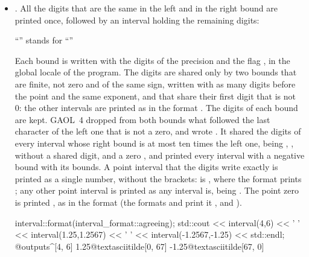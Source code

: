 \documentclass[12pt,a4paper,twoside,openright]{book}
\begin{document}
\begin{itemize}
\item[$\bullet$] . All the digits that are the same in
the left and in the right bound are printed once, followed by an interval
holding the remaining digits:
\begin{center}
``\element{3.141\textasciitilde[5926, 6001]}'' stands for
``''
\end{center}
Each bound is written with the digits of the precision and the flag
, in the global locale of the program. The digits are
shared only by two bounds that are finite, not zero and of the same sign,
written with as many digits before the point and the same exponent, and
that share their first digit that is not 0: the other intervals are printed
as in the format . The digits of each bound are
kept.\newinvfive{} GAOL~4 dropped from both bounds what followed the last
character of the left one that is not a zero, and wrote 
\code{1.25\textasciitilde[, ]}. It shared the digits of every interval
whose right bound is at most ten times the left one,  being
\code{1\textasciitilde[., 0.]},  \code{\textasciitilde[4., 6.]},
without a shared digit, and a zero \code{\textasciitilde[-0., 0.]}, and
printed every interval with a negative bound with its bounds. A point
interval that the digits write exactly is printed as a single number,
without the brackets:  is ,
where the format  prints \code{[4]}; any other point
interval is printed as any interval is,  being
\code{0.100000000000000\textasciitilde[0, 1]}. The point zero is printed
\code{[0]}, as in the format  (the formats 
and  print it , and 
\code{[0x0p+0]}).
\begin{example}
 interval::format(interval_format::agreeing);
 std::cout << interval(4,6) << ' ' << interval(1.25,1.2567) << ' '
           << interval(-1.2567,-1.25) << std::endl;
 @outputs^[4, 6] 1.25@textasciitilde[0, 67] -1.25@textasciitilde[67, 0]~
\end{example}


\end{itemize}
\end{document}
